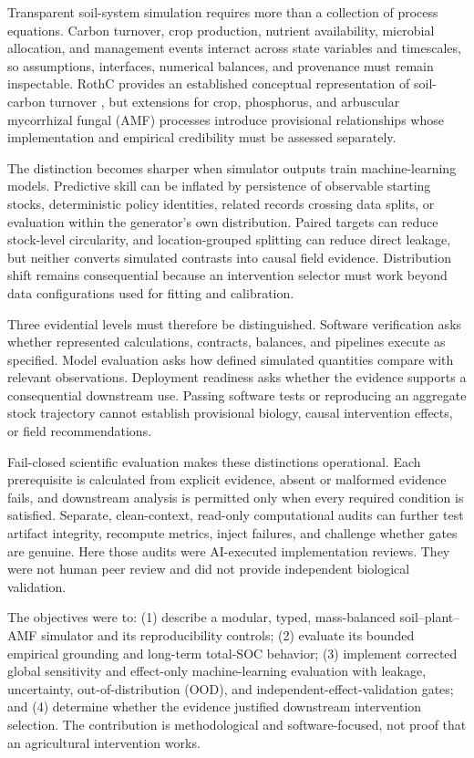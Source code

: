 \documentclass[11pt]{article}
\begin{document}
Transparent soil-system simulation requires more than a collection of process equations. Carbon turnover, crop production, nutrient availability, microbial allocation, and management events interact across state variables and timescales, so assumptions, interfaces, numerical balances, and provenance must remain inspectable. RothC provides an established conceptual representation of soil-carbon turnover \citep{rothamsted2024rothc,coleman2024python}, but extensions for crop, phosphorus, and arbuscular mycorrhizal fungal (AMF) processes introduce provisional relationships whose implementation and empirical credibility must be assessed separately.

The distinction becomes sharper when simulator outputs train machine-learning models. Predictive skill can be inflated by persistence of observable starting stocks, deterministic policy identities, related records crossing data splits, or evaluation within the generator's own distribution. Paired targets can reduce stock-level circularity, and location-grouped splitting can reduce direct leakage, but neither converts simulated contrasts into causal field evidence. Distribution shift remains consequential because an intervention selector must work beyond data configurations used for fitting and calibration.

Three evidential levels must therefore be distinguished. Software verification asks whether represented calculations, contracts, balances, and pipelines execute as specified. Model evaluation asks how defined simulated quantities compare with relevant observations. Deployment readiness asks whether the evidence supports a consequential downstream use. Passing software tests or reproducing an aggregate stock trajectory cannot establish provisional biology, causal intervention effects, or field recommendations.

Fail-closed scientific evaluation makes these distinctions operational. Each prerequisite is calculated from explicit evidence, absent or malformed evidence fails, and downstream analysis is permitted only when every required condition is satisfied. Separate, clean-context, read-only computational audits can further test artifact integrity, recompute metrics, inject failures, and challenge whether gates are genuine. Here those audits were AI-executed implementation reviews. They were not human peer review and did not provide independent biological validation.

The objectives were to: (1) describe a modular, typed, mass-balanced soil--plant--AMF simulator and its reproducibility controls; (2) evaluate its bounded empirical grounding and long-term total-SOC behavior; (3) implement corrected global sensitivity and effect-only machine-learning evaluation with leakage, uncertainty, out-of-distribution (OOD), and independent-effect-validation gates; and (4) determine whether the evidence justified downstream intervention selection. The contribution is methodological and software-focused, not proof that an agricultural intervention works.
\end{document}
